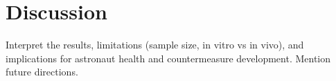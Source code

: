 \section*{Discussion}

Interpret the results, limitations (sample size, in vitro vs in vivo), and implications for astronaut health and countermeasure development. Mention future directions.

